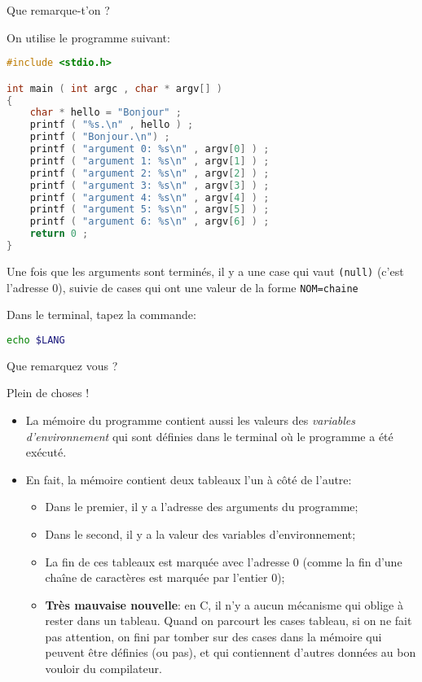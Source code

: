 Que remarque-t'on ?

\begin{solution}
  On utilise le programme suivant:
  \begin{lstlisting}[language=C]
#include <stdio.h>

int main ( int argc , char * argv[] )
{
    char * hello = "Bonjour" ;
    printf ( "%s.\n" , hello ) ;
    printf ( "Bonjour.\n") ;
    printf ( "argument 0: %s\n" , argv[0] ) ;
    printf ( "argument 1: %s\n" , argv[1] ) ;
    printf ( "argument 2: %s\n" , argv[2] ) ;
    printf ( "argument 3: %s\n" , argv[3] ) ;
    printf ( "argument 4: %s\n" , argv[4] ) ;
    printf ( "argument 5: %s\n" , argv[5] ) ;
    printf ( "argument 6: %s\n" , argv[6] ) ;
    return 0 ;
}
  \end{lstlisting}
  Une fois que les arguments sont terminés, il y a une case qui vaut
  \texttt{(null)} (c'est l'adresse 0), suivie de cases qui ont une
  valeur de la forme \texttt{NOM=chaine}
\end{solution}

\question Dans le terminal, tapez la commande:
\begin{lstlisting}[language=bash]
  echo $LANG
\end{lstlisting}
Que remarquez vous ?

\begin{solution}
  Plein de choses !
  \begin{itemize}
  \item La mémoire du programme contient aussi les valeurs des
    \emph{variables d'environnement} qui sont définies dans le
    terminal où le programme a été exécuté.
  \item En fait, la mémoire contient deux tableaux l'un à côté de l'autre:
    \begin{itemize}
    \item Dans le premier, il y a l'adresse des arguments du programme;
    \item Dans le second, il y a la valeur des variables d'environnement;
    \item La fin de ces tableaux est marquée avec l'adresse 0 (comme
      la fin d'une chaîne de caractères est marquée par l'entier 0);
    \item \textbf{Très mauvaise nouvelle}: en C, il n'y a aucun
      mécanisme qui oblige à rester dans un tableau. Quand on parcourt
      les cases tableau, si on ne fait pas attention, on fini par
      tomber sur des cases dans la mémoire qui peuvent être définies
      (ou pas), et qui contiennent d'autres données au bon vouloir du
      compilateur. 
    \end{itemize}
  \end{itemize}

\end{solution}


